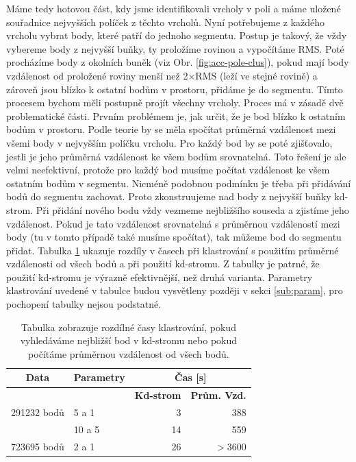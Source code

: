 \documentclass[11pt,twoside,a4paper]{book}
\begin{document}
Máme tedy hotovou část, kdy jsme identifikovali vrcholy v poli a máme uložené souřadnice nejvyšších políček z těchto vrcholů. Nyní potřebujeme z každého vrcholu vybrat body, které patří do jednoho segmentu. Postup je takový, že vždy vybereme body z nejvyšší buňky, ty proložíme rovinou a vypočítáme RMS. Poté procházíme body z okolních buněk (viz Obr. \ref{fig:acc-pole-clus}), pokud mají body vzdálenost od proložené roviny menší než 2$\times$RMS (leží ve stejné rovině) a zároveň jsou blízko k ostatní bodům v prostoru, přidáme je do segmentu. Tímto procesem bychom měli postupně projít všechny vrcholy. Proces má v zásadě dvě problematické části. Prvním problémem je, jak určit, že je bod blízko k ostatním bodům v prostoru. Podle teorie by se měla spočítat průměrná vzdálenost mezi všemi body v nejvyšším políčku vrcholu. Pro každý bod by se poté zjišťovalo, jestli je jeho průměrná vzdálenost ke všem bodům srovnatelná. Toto řešení je ale velmi neefektivní, protože pro každý bod musíme počítat vzdálenost ke všem ostatním bodům v segmentu. Nicméně podobnou podmínku je třeba při přidávání bodů do segmentu zachovat. Proto zkonstruujeme nad body z nejvyšší buňky kd-strom. Při přidání nového bodu vždy vezmeme nejbližšího souseda a zjistíme jeho vzdálenost. Pokud je tato vzdálenost srovnatelná s průměrnou vzdáleností mezi body (tu v tomto případě také musíme spočítat), tak můžeme bod do segmentu přidat. Tabulka \ref{table:podminka-vzdalenosti} ukazuje rozdíly v časech při klastrování s použitím průměrné vzdálenosti od všech bodů a při použití kd-stromu. Z tabulky je patrné, že použití kd-stromu je výrazně efektivnější, než druhá varianta. Parametry klastrování uvedené v tabulce budou vysvětleny později v sekci \ref{sub:param}, pro pochopení tabulky nejsou podstatné.

\begin{table}[ht]
\begin{tabular}{|c|l|r|r|}
\hline
\multicolumn{ 1}{|c|}{\textbf{Data}} & \multicolumn{ 1}{c|}{\textbf{Parametry}} & \multicolumn{ 2}{c|}{\textbf{Čas [s]}} \\ \hline
\multicolumn{ 1}{|l|}{} & \multicolumn{ 1}{l|}{} & \multicolumn{1}{l|}{\textbf{Kd-strom}} & \multicolumn{1}{l|}{\textbf{Prům. Vzd.}} \\ \hline
\multicolumn{ 1}{|c|}{291232 bodů} & 5 a 1 & 3 & 388 \\ \hline
\multicolumn{ 1}{|l|}{} & 10 a 5 & 14 & 559 \\ \hline
723695 bodů & 2 a 1 & 26 & $>$3600 \\ \hline
\end{tabular}

\caption{Tabulka zobrazuje rozdílné časy klastrování, pokud vyhledáváme nejbližší bod v kd-stromu nebo pokud počítáme průměrnou vzdálenost od všech bodů.} 
\label{table:podminka-vzdalenosti}
\end{table}
\end{document}

